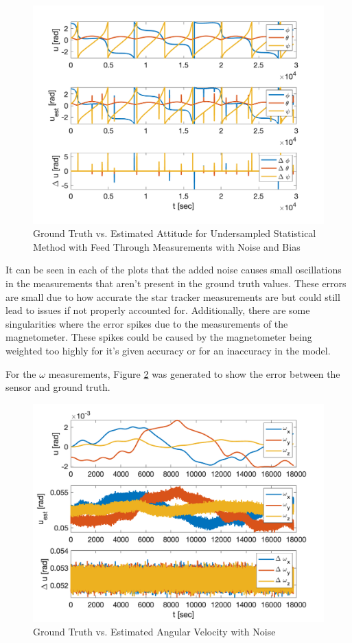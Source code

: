 \begin{figure}[H]
    \centering
    \captionsetup{ justification = centering }
    \includegraphics[width = 12cm]{Images/PS7/attitude_estimation_undersampled_q_default.png}
    \caption{Ground Truth vs. Estimated Attitude for Undersampled Statistical Method with Feed Through Measurements with Noise and Bias}
    \label{fig:stat_attitude_undersampled_default_noise}
\end{figure}

It can be seen in each of the plots that the added noise causes small oscillations in the measurements that aren't present in the ground truth values. These errors are small due to how accurate the star tracker measurements are but could still lead to issues if not properly accounted for. Additionally, there are some singularities where the error spikes due to the measurements of the magnetometer. These spikes could be caused by the magnetometer being weighted too highly for it's given accuracy or for an inaccuracy in the model.

For the $\omega$ measurements, Figure \ref{fig:omega_noise} was generated to show the error between the sensor and ground truth.

\begin{figure}[H]
    \centering
    \captionsetup{ justification = centering }
    \includegraphics[width = 12cm]{Images/PS7/obcVsGroundOmegas.png}
    \caption{Ground Truth vs. Estimated Angular Velocity with Noise}
    \label{fig:omega_noise}
\end{figure}

